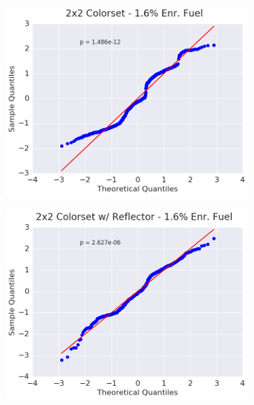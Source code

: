 \begin{figure}[h!]
\begin{subfigure}{0.5\textwidth}
  \centering
  \includegraphics[width=\linewidth]{figures/patterns/2x2/quantile/16-enr-capt-1}
  \caption{}
  \label{fig:chap9-qq-2x2-1.6-capt}
\end{subfigure}%
\begin{subfigure}{0.5\textwidth}
  \centering
  \includegraphics[width=\linewidth]{figures/patterns/reflector/quantile/16-enr-capt-1}  \caption{}
  \label{fig:chap9-qq-reflector-1.6-capt}
\end{subfigure}
\begin{subfigure}{0.5\textwidth}
  \centering

\end{subfigure}
\end{figure}
